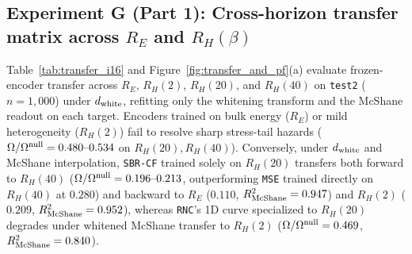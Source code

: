 \documentclass[preprint,11pt,a4paper]{elsarticle}
\begin{document}
\subsection{Experiment G (Part 1): Cross-horizon transfer matrix across $R_E$ and $R_H(\beta)$}

Table~\ref{tab:transfer_i16} and Figure~\ref{fig:transfer_and_pf}(a) evaluate frozen-encoder transfer across $R_E$, $R_H(2)$, $R_H(20)$, and $R_H(40)$ on \texttt{test2} ($n=1{,}000$) under $d_{\rm white}$, refitting only the whitening transform and the McShane readout on each target. Encoders trained on bulk energy ($R_E$) or mild heterogeneity ($R_H(2)$) fail to resolve sharp stress-tail hazards ($\Omega/\Omega^{\rm null}=0.480\text{--}0.534$ on $R_H(20), R_H(40)$). Conversely, under $d_{\rm white}$ and McShane interpolation, \texttt{SBR-CF} trained solely on $R_H(20)$ transfers both forward to $R_H(40)$ ($\Omega/\Omega^{\rm null}=0.196\text{--}0.213$, outperforming \texttt{MSE} trained directly on $R_H(40)$ at $0.280$) and backward to $R_E$ ($0.110$, $R^2_{\rm McShane}=0.947$) and $R_H(2)$ ($0.209$, $R^2_{\rm McShane}=0.952$), whereas \texttt{RNC}'s 1D curve specialized to $R_H(20)$ degrades under whitened McShane transfer to $R_H(2)$ ($\Omega/\Omega^{\rm null}=0.469$, $R^2_{\rm McShane}=0.840$).
\end{document}
